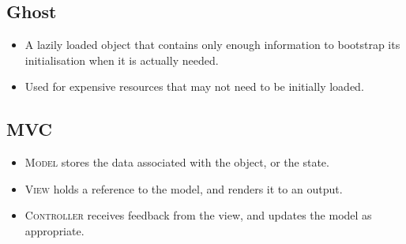 \documentclass[landscape]{cheat}
\begin{document}
\begin{multicols*}{3}
\subsection{Ghost}
\begin{itemize}
    \item A lazily loaded object that contains only enough information to bootstrap its initialisation when it is actually needed.
    \item Used for expensive resources that may not need to be initially loaded.
\end{itemize}

\subsection{MVC}
\begin{itemize}
    \item \textsc{Model} stores the data associated with the object, or the state.
    \item \textsc{View} holds a reference to the model, and renders it to an output.
    \item \textsc{Controller} receives feedback from the view, and updates the model as appropriate.
\end{itemize}

\end{multicols*}
\end{document}
